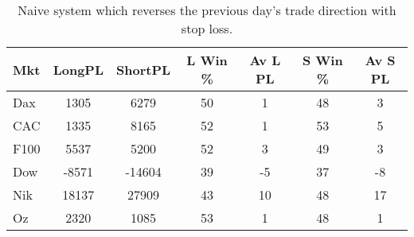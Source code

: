 \begin{table}[ht]
\centering
\caption[Naive Following System.]{Naive system which reverses the previous day's trade direction with stop loss.} 
\label{tab:ntfresults_sl}
\begin{tabular}{lcccccc}
  \toprule Mkt & LongPL & ShortPL & L Win \% & Av L PL & S Win \% & Av S PL \\ 
  \midrule Dax & 1305 & 6279 & 50 & 1 & 48 & 3 \\ 
  CAC & 1335 & 8165 & 52 & 1 & 53 & 5 \\ 
  F100 & 5537 & 5200 & 52 & 3 & 49 & 3 \\ 
  Dow & -8571 & -14604 & 39 & -5 & 37 & -8 \\ 
  Nik & 18137 & 27909 & 43 & 10 & 48 & 17 \\ 
  Oz & 2320 & 1085 & 53 & 1 & 48 & 1 \\ 
   \bottomrule \end{tabular}
\end{table}
